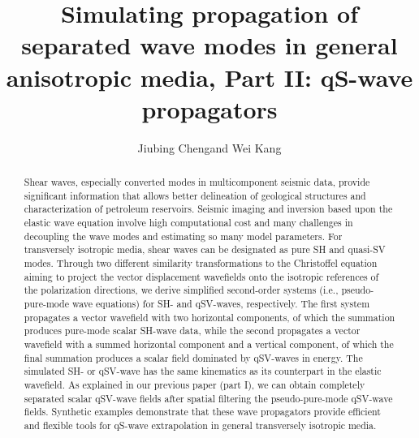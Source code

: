 \title{Simulating propagation of separated wave modes in general anisotropic media,
Part II: qS-wave propagators}

\author{Jiubing Cheng\footnotemark[1] and Wei Kang\footnotemark[2]}

\address{
\footnotemark[1] State Key Laboratory of Marine Geology,\\
Tongji University, Shanghai, China. E-mail: cjb1206@tongji.edu.cn\\
\footnotemark[2] Formerly Tongji University, Shanghai, China;\\
presently Schlumberger, Houston, Texas, USA. E-mail: wkang@slb.com\\
}


\maketitle

\newpage
%
\begin{abstract}
Shear waves, especially converted modes in multicomponent seismic data, 
provide significant information that allows better delineation of
geological structures and characterization of petroleum reservoirs.
Seismic imaging and inversion based upon the elastic wave equation involve high computational
cost and many challenges in decoupling the wave modes and estimating so many model parameters.
For transversely isotropic media, shear waves can be designated as pure SH and quasi-SV modes.
Through two different similarity transformations to the Christoffel equation aiming to project the
vector displacement wavefields onto the isotropic references of the polarization directions,
we derive simplified second-order systems (i.e., pseudo-pure-mode wave equations)
for SH- and qSV-waves, respectively.
The first system propagates a vector wavefield with two horizontal components, of which the summation
produces pure-mode scalar SH-wave data,
while the second propagates a vector wavefield with a summed horizontal component and a vertical component,
of which the final summation produces a scalar field dominated by qSV-waves in energy.
The simulated SH- or qSV-wave has the same kinematics as its counterpart in the elastic wavefield.
As explained in our previous paper (part I), we can obtain completely separated 
scalar qSV-wave fields after spatial filtering the pseudo-pure-mode qSV-wave fields.
Synthetic examples demonstrate that these wave propagators provide efficient and flexible tools 
for qS-wave extrapolation in general transversely isotropic media.
\end{abstract}

